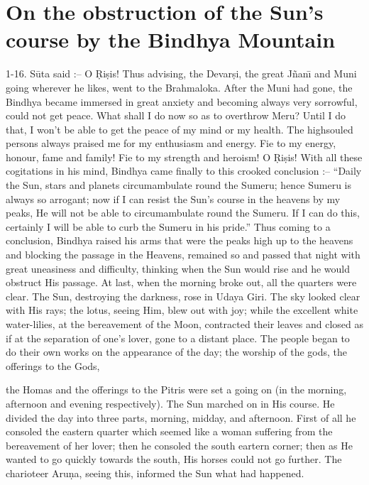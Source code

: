 \chapter{On the obstruction of the Sun's course by the Bindhya Mountain}

1-16. S\=uta said :-- O \d{R}i\d{s}is! Thus advising, the Devar\d{s}i, the great J\~nan\={\i} and Muni going wherever he likes, went to the Brahmaloka. After the Muni had gone, the Bindhya became immersed in great anxiety and becoming always very sorrowful, could not get peace. What shall I do now so as to overthrow Meru? Until I do that, I won't be able to get the peace of my mind or my health. The highsouled persons always praised me for my enthusiasm and energy. Fie to my energy, honour, fame and family! Fie to my strength and heroism! O \d{R}i\d{s}is! With all these cogitations in his mind, Bindhya came finally to this crooked conclusion :-- ``Daily the Sun, stars and planets circumambulate round the Sumeru; hence Sumeru is always so arrogant; now if I can resist the Sun's course in the heavens by my peaks, He will not be able to circumambulate round the Sumeru. If I can do this, certainly I will be able to curb the Sumeru in his pride.'' Thus coming to a conclusion, Bindhya raised his arms that were the peaks high up to the heavens and blocking the passage in the Heavens, remained so and passed that night with great uneasiness and difficulty, thinking when the Sun would rise and he would obstruct His passage. At last, when the morning broke out, all the quarters were clear. The Sun, destroying the darkness, rose in Udaya Giri. The sky looked clear with His rays; the lotus, seeing Him, blew out with joy; while the excellent white water-lilies, at the bereavement of the Moon, contracted their leaves and closed as if at the separation of one's lover, gone to a distant place. The people began to do their own works on the appearance of the day; the worship of the gods, the offerings to the Gods,

the Homas and the offerings to the Pitris were set a going on (in the morning, afternoon and evening respectively). The Sun marched on in His course. He divided the day into three parts, morning, midday, and afternoon. First of all he consoled the eastern quarter which seemed like a woman suffering from the bereavement of her lover; then he consoled the south eartern corner; then as He wanted to go quickly towards the south, His horses could not go further. The charioteer Aru\d{n}a, seeing this, informed the Sun what had happened.

